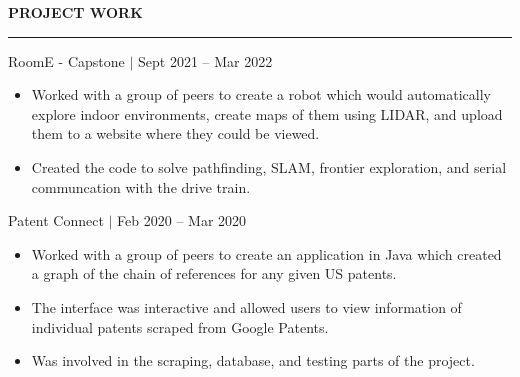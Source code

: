 \documentclass[12pt]{article}
\newcommand{\sectionRule}{\textcolor{gray}{\rule{7.27in}{0.02cm}}}
\newcommand{\sectionTxt}[1]{\noindent\textbf{#1}\\}
\newcommand{\projText}[2]{\noindent#1 $|$ {\color{textGray} #2}}
\begin{document}
    \sectionTxt{PROJECT WORK}
    \sectionRule

    \projText{RoomE - Capstone}{Sept 2021 -- Mar 2022}
    \begin{small}
        \begin{itemize}
            \itemsep0em 
            \item {\color{textGray} Worked with a group of peers to create a robot which would automatically explore indoor environments, create maps of them using LIDAR, and upload them to a website where they could be viewed.}
            \item {\color{textGray} Created the code to solve pathfinding, SLAM, frontier exploration, and serial communcation with the drive train. }
        \end{itemize}
    \end{small}

    \projText{Patent Connect}{Feb 2020 -- Mar 2020}
    \begin{small}
        \begin{itemize}
            \itemsep0em 
            \item {\color{textGray} Worked with a group of peers to create an application in Java which created a graph of the chain of references for any given US patents.}
            \item {\color{textGray} The interface was interactive and allowed users to view information of individual patents scraped from Google Patents.}
            \item {\color{textGray} Was involved in the scraping, database, and testing parts of the project.}
        \end{itemize}
    \end{small}
\end{document}
